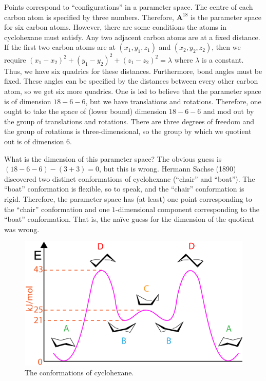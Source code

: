 \documentclass [11 pt, oneside, margin = 1 in] {article}
\begin{document}
\begin{example}\label{}\text{}
Points correspond to ``configurations'' in a parameter space. The centre of each carbon atom is specified by three numbers. Therefore, $\mathbf{A}^{18}$ is the parameter space for six carbon atoms. However, there are some conditions the atoms in cyclohexane must satisfy. Any two adjacent carbon atoms are at a fixed distance. If the first two carbon atoms are at $(x_1,y_1,z_1)$ and $(x_2,y_2,z_2)$, then we require $(x_1-x_2)^2 + (y_1-y_2)^2 + (z_1-z_2)^2=\lambda$ where $\lambda$ is a constant. Thus, we have six quadrics for these distances. Furthermore, bond angles must be fixed. These angles can be specified by the distances between every other carbon atom, so we get six more quadrics. One is led to believe that the parameter space is of dimension $18-6-6$, but we have translations and rotations. Therefore, one ought to take the space of (lower bound) dimension $18-6-6$ and mod out by the group of translations and rotations. There are three degrees of freedom and the group of rotations is three-dimensional, so the group by which we quotient out is of dimension $6$. 

What is the dimension of this parameter space? The obvious guess is $ (18-6-6) - (3+3)=0$, but this is wrong. Hermann Sachse (1890) discovered two distinct conformations of cyclohexane (``chair'' and ``boat''). The ``boat'' conformation is flexible, so to speak, and the ``chair'' conformation is rigid. Therefore, the parameter space has (at least) one point corresponding to the ``chair'' conformation and one $1$-dimensional component corresponding to the ``boat'' conformation. That is, the na\"ive guess for the dimension of the quotient was wrong.
\end{example}
\iffalse
\begin{figure}
	\begin{center}
		\includegraphics[scale=0.5]{images/cyclohexane_conformations}
		\caption{The conformations of cyclohexane.}
	\end{center}
\end{figure}
\end{document}

